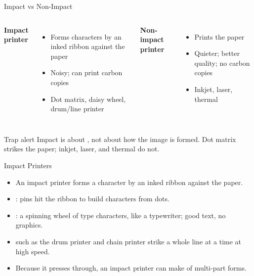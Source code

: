 \documentclass[aspectratio=169]{beamer}
\begin{document}
\begin{frame}{Impact vs Non-Impact}
  \begin{columns}[T]
      \textbf{Impact printer}
      \begin{itemize}
        \item Forms characters by  an inked ribbon against
          the paper
        \item Noisy; can print carbon copies
        \item Dot matrix, daisy wheel, drum/line printer
      \end{itemize}
      \textbf{Non-impact printer}
      \begin{itemize}
        \item Prints  the paper
        \item Quieter; better quality; no carbon copies
        \item Inkjet, laser, thermal
      \end{itemize}
  \end{columns}
  \vspace{0.3cm}
  \begin{alertblock}{Trap alert}
    Impact is about , not about how the image is
    formed. Dot matrix strikes the paper; inkjet, laser, and thermal do not.
  \end{alertblock}
\end{frame}

\begin{frame}{Impact Printers}
  \begin{itemize}
    \item An impact printer forms a character by  an
      inked ribbon against the paper.
    \item {}: pins hit the ribbon to build characters from dots.
    \item {}: a spinning wheel of type characters, like a
      typewriter; good text, no graphics.
    \item {} such as the drum printer and chain printer
      strike a whole line at a time at high speed.
    \item Because it presses through, an impact printer can make
       of multi-part forms.
  \end{itemize}
\end{frame}
\end{document}
